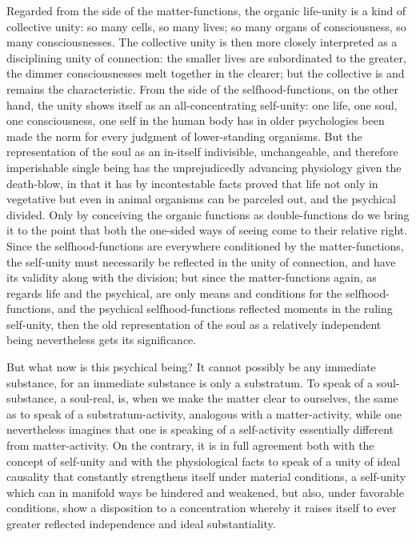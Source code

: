 \documentclass[12pt]{article}
\begin{document}
Regarded from the side of the matter-functions, the organic life-unity is a
kind of collective unity: so many cells, so many lives; so many organs of
consciousness, so many consciousnesses. The collective unity is then more
closely interpreted as a disciplining unity of connection: the smaller lives
are subordinated to the greater, the dimmer consciousnesses melt together in
the clearer; but the collective is and remains the characteristic. From the
side of the selfhood-functions, on the other hand, the unity shows itself as
an all-concentrating self-unity: one life, one soul, one consciousness, one
self in the human body has in older psychologies been made the norm for every
judgment of lower-standing organisms. But the representation of the soul as
an in-itself indivisible, unchangeable, and therefore imperishable single
being has the unprejudicedly advancing physiology given the death-blow, in
that it has by incontestable facts proved that life not only in vegetative
but even in animal organisms can be parceled out, and the psychical divided.
Only by conceiving the organic functions as double-functions do we bring it
to the point that both the one-sided ways of seeing come to their relative
right. Since the selfhood-functions are everywhere conditioned by the
matter-functions, the self-unity must necessarily be reflected in the unity
of connection, and have its validity along with the division; but since the
matter-functions again, as regards life and the psychical, are only means and
conditions for the selfhood-functions, and the psychical selfhood-functions
reflected moments in the ruling self-unity, then the old representation of
the soul as a relatively independent being nevertheless gets its
significance.

But what now is this psychical being? It cannot possibly be any immediate
substance, for an immediate substance is only a substratum. To speak of a
soul-substance, a soul-real,
is, when we make the matter clear to ourselves, the same as to speak of a
substratum-activity, analogous with a matter-activity, while one
nevertheless imagines that one is speaking of a self-activity essentially
different from matter-activity. On the contrary, it is in full agreement both
with the concept of self-unity and with the physiological facts to speak of a
unity of ideal causality that constantly strengthens itself under material
conditions, a self-unity which can in manifold ways be hindered and weakened,
but also, under favorable conditions, show a disposition to a concentration
whereby it raises itself to ever greater reflected independence and ideal
substantiality.
\end{document}
